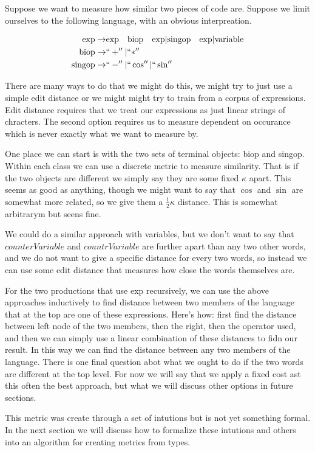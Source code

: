 Suppose we want to measure how similar two pieces of code are.
Suppose we limit ourselves to the following language, with an obvious interpreation.

\begin{align*}
\text{exp} \to& \text{exp}\quad \text{biop} \quad \text{exp} | \text{singop} \quad \text{exp} | \text{variable} \\
\text{biop} \to & ``+'' | ``*'' \\ 
\text{singop} \to& ``-'' | ``\cos'' | ``\sin''
\end{align*}

There are many ways to do that we might do this,
we might try to just use a simple edit distance
or we might might try to train from a corpus of expressions.
Edit distance requires that we treat our expressions as just linear strings of chracters.
The second option requires us to measure dependent on occurance which is never exactly what we want to measure by.

One place we can start is with the two sets of terminal objects: biop and singop.
Within each class we can use a discrete metric to measure similarity.
That is if the two objects are different we simply say they are some fixed $\kappa$ apart.
This seems as good as anything, though we might want to say that $\cos$ and $\sin$ are somewhat more related, so we give them a $\frac{1}{2}\kappa$ distance.
This is somewhat arbitrarym but seens fine.

We could do a similar approach with variables, but we don't want to say that $counterVariable$ and $countrVariable$ are further apart than any two other words,
and we do not want to give a specific distance for every two words, so instead we can use some edit distance that measures how close the words themselves are.

For the two productions that use exp recursively, we can use the above approaches inductively to find distance between two members of the language that at the top are one of these expressions.
Here's how: first find the distance between left node of the two members, then the right, then the operator used, and then we can simply use a linear combination of these distances to fidn our result.
In this way we can find the distance between any two members of the language.
There is one final question abot what we ought to do if the two words are different at the top level.
For now we will say that we apply a fixed cost ast this often the best approach,
but what we will discuss other options in future sections.

This metric was create through a set of intutions but is not yet something formal.
In the next section we will discuss how to formalize these intutions and others into an algorithm for creating metrics from types.